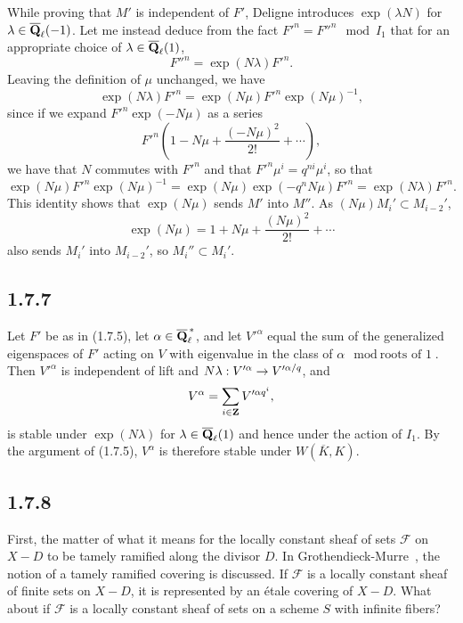 \documentclass[deligne.tex]{subfiles}
\begin{document}
While proving that $M'$ is independent of $F'$, Deligne introduces
$\exp(\lambda N)$ for $\lambda\in\overline{\mathbf{Q}}_\ell(-1)$. Let me instead
deduce from the fact $F'^n=F''^n\mod I_1$ that for an appropriate choice of
$\lambda\in\overline{\mathbf{Q}}_\ell(1)$,
\begin{equation*}
	F''^n=\exp(N\lambda)F'^n.
\end{equation*}
Leaving the definition of $\mu$ unchanged, we have
\begin{equation*}
	\exp(N\lambda)F'^n	= \exp(N\mu)F'^n\exp(N\mu)^{-1},
\end{equation*}
since if we expand $F'^n\exp(-N\mu)$ as a series
\begin{equation*}
	F'^n\left(1-N\mu+\frac{(-N\mu)^2}{2!}+\cdots\right),
\end{equation*}
we have that $N$ commutes with $F'^n$ and that
$F'^n\mu^i=q^{ni}\mu^i$, so that
\begin{equation*}
	\exp(N\mu)F'^n\exp(N\mu)^{-1} =
	\exp(N\mu)\exp(-q^nN\mu)F'^n =
	\exp(N\lambda)F'^n.
\end{equation*}
This identity shows that $\exp(N\mu)$ sends $M'$ into $M''$.
As $(N\mu)M_i'\subset M_{i-2}'$,
\begin{equation*}
	\exp(N\mu)=1+N\mu+\frac{(N\mu)^2}{2!}+\cdots
\end{equation*}
also sends $M_i'$ into $M_{i-2}'$, so $M_i''\subset M_i'$.

\subsection*{1.7.7} Let $F'$ be as in (1.7.5), let
$\alpha\in\overline{\mathbf{Q}}_\ell^{\,\ast}$, and let $V'^\alpha$ equal the
sum of the generalized eigenspaces of $F'$ acting on $V$ with eigenvalue
in the class of $\alpha\mod \text{roots of 1}$. Then $V'^\alpha$ is
independent of lift and $N\lambda:V'^\alpha\rightarrow V'^{\alpha/q}$, and
\begin{equation*}
	V^\alpha=\sum_{i\in\mathbf{Z}} V'^{\alpha q^i},
\end{equation*}
is stable under $\exp(N\lambda)$ for $\lambda\in\overline{\mathbf{Q}}_\ell(1)$ and
hence under the action of $I_1$. By the argument of (1.7.5), $V^\alpha$ is
therefore stable under $W(\overline K,K)$.

\subsection*{1.7.8}\label{1.7.8}
First, the matter of what it means for the locally constant sheaf of sets
$\mathscr F$ on $X-D$ to be tamely ramified along the divisor $D$.
In Grothendieck-Murre~\cite{GM}, the notion of a tamely ramified covering is
discussed. If $\mathscr F$ is a locally constant sheaf of finite sets on
$X-D$, it is represented by an étale covering of $X-D$.
What about if $\mathscr F$ is a locally constant sheaf of sets on a scheme
$S$ with infinite fibers?
\end{document}

